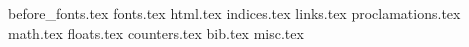 {before_fonts.tex}
{fonts.tex}
{html.tex}
{indices.tex}
{links.tex}
{proclamations.tex}
{math.tex}
{floats.tex}
{counters.tex}
{bib.tex}
{misc.tex}
